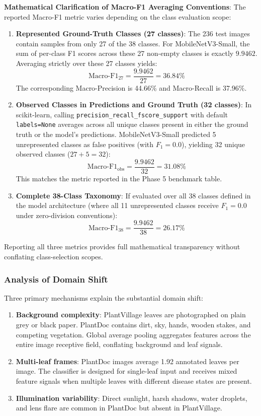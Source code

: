 \documentclass[pdflatex,sn-mathphys-num]{sn-jnl}
\theoremstyle{thmstyleone}%
\theoremstyle{thmstyletwo}%
\theoremstyle{thmstylethree}%
\begin{document}
\textbf{Mathematical Clarification of Macro-F1 Averaging Conventions}:
The reported Macro-F1 metric varies depending on the class evaluation scope:
\begin{enumerate}
  \item \textbf{Represented Ground-Truth Classes (27 classes)}: The 236 test images contain samples from only 27 of the 38 classes. For MobileNetV3-Small, the sum of per-class F1 scores across these 27 non-empty classes is exactly $9.9462$. Averaging strictly over these 27 classes yields:
  $$\text{Macro-F1}_{27} = \frac{9.9462}{27} = 36.84\%$$
  The corresponding Macro-Precision is 44.66\% and Macro-Recall is 37.96\%.
  \item \textbf{Observed Classes in Predictions and Ground Truth (32 classes)}: In scikit-learn, calling \texttt{precision\_recall\_fscore\_support} with default \texttt{labels=None} averages across all unique classes present in either the ground truth or the model's predictions. MobileNetV3-Small predicted 5 unrepresented classes as false positives (with $F_1 = 0.0$), yielding 32 unique observed classes ($27 + 5 = 32$):
  $$\text{Macro-F1}_{\text{obs}} = \frac{9.9462}{32} = 31.08\%$$
  This matches the metric reported in the Phase 5 benchmark table.
  \item \textbf{Complete 38-Class Taxonomy}: If evaluated over all 38 classes defined in the model architecture (where all 11 unrepresented classes receive $F_1 = 0.0$ under zero-division conventions):
  $$\text{Macro-F1}_{38} = \frac{9.9462}{38} = 26.17\%$$
\end{enumerate}
Reporting all three metrics provides full mathematical transparency without conflating class-selection scopes.

\subsubsection{Analysis of Domain Shift}

Three primary mechanisms explain the substantial domain shift:
\begin{enumerate}
  \item \textbf{Background complexity}: PlantVillage leaves are photographed on plain
        grey or black paper. PlantDoc contains dirt, sky, hands, wooden stakes, and
        competing vegetation. Global average pooling aggregates features across the
        entire image receptive field, conflating background and leaf signals.
  \item \textbf{Multi-leaf frames}: PlantDoc images average 1.92 annotated leaves per
        image. The classifier is designed for single-leaf input and receives mixed
        feature signals when multiple leaves with different disease states are present.
  \item \textbf{Illumination variability}: Direct sunlight, harsh shadows, water
        droplets, and lens flare are common in PlantDoc but absent in PlantVillage.
\end{enumerate}
\end{document}
